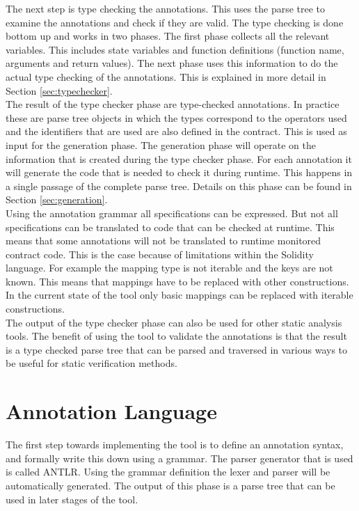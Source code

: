 \documentclass[a4paper]{article}
\begin{document}
The next step is type checking the annotations. This uses the parse tree to examine the annotations and check if they are valid. The type checking is done bottom up and works in two phases. The first phase collects all the relevant variables. This includes state variables and function definitions (function name, arguments and return values). The next phase uses this information to do the actual type checking of the annotations. This is explained in more detail in Section \ref{sec:typechecker}. \\
The result of the type checker phase are type-checked annotations. In practice these are parse tree objects in which the types correspond to the operators used and the identifiers that are used are also defined in the contract. This is used as input for the generation phase. The generation phase will operate on the information that is created during the type checker phase. For each annotation it will generate the code that is needed to check it during runtime. This happens in a single passage of the complete parse tree. Details on this phase can be found in Section \ref{sec:generation}. \\
Using the annotation grammar all specifications can be expressed. But not all specifications can be translated to code that can be checked at runtime. This means that some annotations will not be translated to runtime monitored contract code. This is the case because of limitations within the Solidity language. For example the mapping type is not iterable and the keys are not known. This means that mappings have to be replaced with other constructions. In the current state of the tool only basic mappings can be replaced with iterable constructions. \\
The output of the type checker phase can also be used for other static analysis tools. The benefit of using the tool to validate the annotations is that the result is a type checked parse tree that can be parsed and traversed in various ways to be useful for static verification methods. 

\section{Annotation Language}
\label{sec:annotationlanguage}
The first step towards implementing the tool is to define an annotation syntax, and formally write this down using a grammar. The parser generator that is used is called ANTLR. Using the grammar definition the lexer and parser will be automatically generated. The output of this phase is a parse tree that can be used in later stages of the tool.
\end{document}
